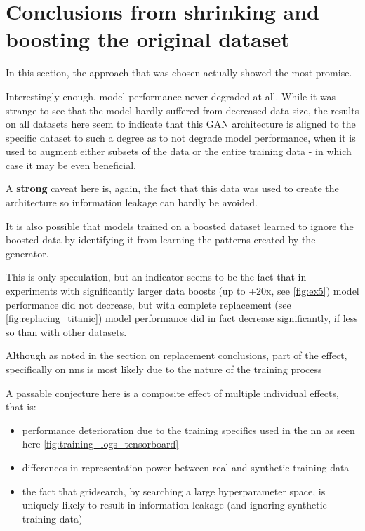 \pagebreak

\section{Conclusions from shrinking and boosting the original dataset}

In this section, the approach that was chosen actually showed the most promise. 

Interestingly enough, model performance never degraded at all. While it was strange to see that the model hardly suffered from decreased data size, the results on all datasets here seem to indicate that this \ac{GAN} architecture is aligned to the specific dataset to such a degree as to not degrade model performance, when it is used to augment either subsets of the data or the entire training data - in which case it may be even beneficial.

A \textbf{strong} caveat here is, again, the fact that this data was used to create the architecture so information leakage can hardly be avoided.

It is also possible that models trained on a boosted dataset learned to ignore the boosted data by identifying it from learning the patterns created by the generator. 

This is only speculation, but an indicator seems to be the fact that in experiments with significantly larger data boosts (up to +20x, see \ref{fig:ex5}) model performance did not decrease, but with complete replacement (see \ref{fig:replacing_titanic}) model performance did in fact decrease significantly, if less so than with other datasets. 

Although as noted in the section on replacement conclusions, part of the effect, specifically on \acp{nn} is most likely due to the nature of the training process

\pagebreak

A passable conjecture here is a composite effect of multiple individual effects, that is: 

\begin{itemize}
	\item performance deterioration due to the training specifics used in the \ac{nn} as seen here \ref{fig:training_logs_tensorboard}
	\item differences in representation power between real and synthetic training data
	\item the fact that gridsearch, by searching a large hyperparameter space, is uniquely likely to result in information leakage (and ignoring synthetic training data)
\end{itemize}

